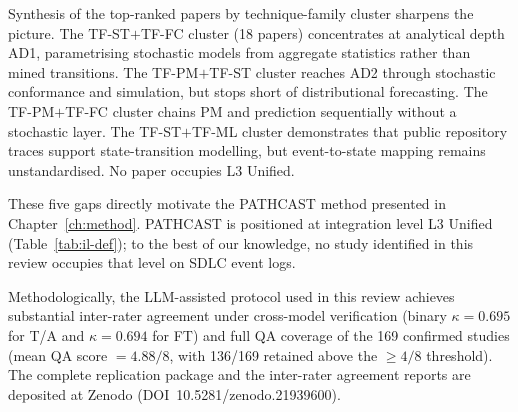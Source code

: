 Synthesis of the top-ranked papers by technique-family cluster sharpens the picture. The
TF-ST$+$TF-FC cluster (18 papers) concentrates at analytical depth AD1, parametrising stochastic models
from aggregate statistics rather than mined transitions. The TF-PM$+$TF-ST cluster
reaches AD2 through stochastic conformance and simulation, but stops short of
distributional forecasting. The TF-PM$+$TF-FC cluster chains PM and prediction
sequentially without a stochastic layer. The TF-ST$+$TF-ML cluster demonstrates that
public repository traces support state-transition modelling, but event-to-state
mapping remains unstandardised. No paper occupies L3 Unified.

These five gaps directly motivate the PATHCAST method presented in
Chapter~\ref{ch:method}. PATHCAST is positioned at integration level L3
Unified (Table~\ref{tab:il-def}); to the best of our knowledge, no study
identified in this review occupies that level on SDLC event logs.

Methodologically, the LLM-assisted protocol used in this review achieves
substantial inter-rater agreement under cross-model verification (binary
$\kappa = 0.695$ for T/A and $\kappa = 0.694$ for FT) and full QA coverage of
the 169 confirmed studies (mean QA score $= 4.88/8$, with 136/169 retained
above the $\geq 4/8$ threshold). The complete replication package and the
inter-rater agreement reports are deposited at Zenodo
(DOI~10.5281/zenodo.21939600).
